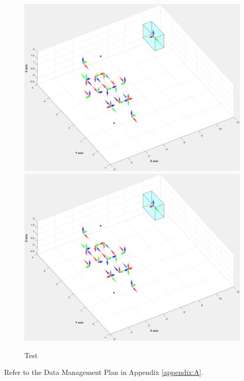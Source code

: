 \documentclass[a4paper]{article}
\begin{document}
%
\tableofcontents
\thispagestyle{empty}
\clearpage

\setcounter{page}{1}










\newpage
\begin{center}
\begin{figure}[ht]
  \includegraphics[page=1,width=.5\textwidth]{image/test2.pdf}
  \includegraphics[page=1,width=.5\textwidth]{image/test2.pdf}
  \caption{Test}
  \label{fig:Test}
\end{figure}
\end{center}



\newpage
Refer to the Data Management Plan in Appendix \ref{appendix:A}.

%
%
%
%
%
%
\cite{Barraquand91_MP_DisctributedRepresenation}
\end{document}
